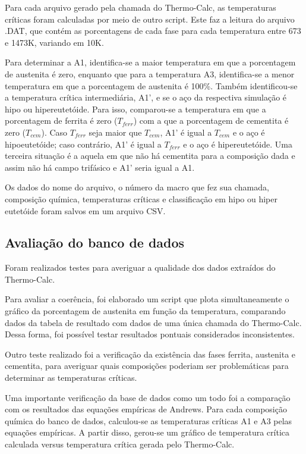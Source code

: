 \documentclass[brazil,tf,epusp]{usp}  %
\begin{document}
Para cada arquivo gerado pela chamada do Thermo-Calc\textregistered{}, as temperaturas críticas foram calculadas por meio de outro script. Este faz a leitura do arquivo .DAT, que contém as porcentagens de cada fase para cada temperatura entre 673 e 1473K, variando em 10K.

Para determinar a A1, identifica-se a maior temperatura em que a porcentagem de austenita é zero, enquanto que para a temperatura A3, identifica-se a menor temperatura em que a porcentagem de austenita é 100\%. Também identificou-se a temperatura crítica intermediária, A1', e se o aço da respectiva simulação é hipo ou hipereutetóide. Para isso, comparou-se a temperatura em que a porcentagem de ferrita é zero ($T_{ferr}$) com a que a porcentagem de cementita é zero ($T_{cem}$). Caso $T_{ferr}$ seja maior que $T_{cem}$, A1' é igual a $T_{cem}$ e o aço é hipoeutetóide; caso contrário, A1' é igual a $T_{ferr}$ e o aço é hipereutetóide. Uma terceira situação é a aquela em que não há cementita para a composição dada e assim não há campo trifásico e A1' seria igual a A1.

Os dados do nome do arquivo, o número da macro que fez sua chamada, composição química, temperaturas críticas e classificação em hipo ou hiper eutetóide foram salvos em um arquivo CSV.

\subsection{Avaliação do banco de dados}

Foram realizados testes para averiguar a qualidade dos dados extraídos do Thermo-Calc\textregistered{}.

Para avaliar a coerência, foi elaborado um script que plota simultaneamente o gráfico da porcentagem de austenita em função da temperatura, comparando dados da tabela de resultado com dados de uma única chamada do Thermo-Calc\textregistered{}. Dessa forma, foi possível testar resultados pontuais considerados inconsistentes.

Outro teste realizado foi a verificação da existência das fases ferrita, austenita e cementita, para averiguar quais composições poderiam ser problemáticas para determinar as temperaturas críticas.

Uma importante verificação da base de dados como um todo foi a comparação com os resultados das equações empíricas de Andrews. Para cada composição química do banco de dados, calculou-se as temperaturas críticas A1 e A3 pelas equações empíricas. A partir disso, gerou-se um gráfico de temperatura crítica calculada versus temperatura crítica gerada pelo Thermo-Calc\textregistered{}.
\end{document}
